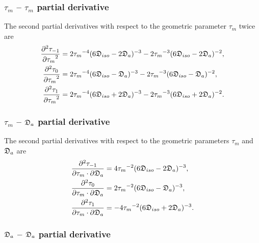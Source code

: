 \subsubsection{$\tau_m$ -- $\tau_m$ partial derivative}

The second partial derivatives with respect to the geometric parameter $\tau_m$ twice are
\begin{subequations}
\begin{align}
    \frac{\partial^2 \tau_{-1}}{{\partial \tau_m}^2} &= 2{\tau_m}^{-4} (6\mathfrak{D}_{iso} - 2\mathfrak{D}_a)^{-3}
        - 2{\tau_m}^{-3} (6\mathfrak{D}_{iso} - 2\mathfrak{D}_a)^{-2}, \\
    \frac{\partial^2 \tau_{0}}{{\partial \tau_m}^2}  &= 2{\tau_m}^{-4} (6\mathfrak{D}_{iso} - \mathfrak{D}_a)^{-3}
        - 2{\tau_m}^{-3} (6\mathfrak{D}_{iso} - \mathfrak{D}_a)^{-2}, \\
    \frac{\partial^2 \tau_{1}}{{\partial \tau_m}^2}  &= 2{\tau_m}^{-4} (6\mathfrak{D}_{iso} + 2\mathfrak{D}_a)^{-3}
        - 2{\tau_m}^{-3} (6\mathfrak{D}_{iso} + 2\mathfrak{D}_a)^{-2}.
\end{align}
\end{subequations}



\subsubsection{$\tau_m$ -- $\mathfrak{D}_a$ partial derivative}

The second partial derivatives with respect to the geometric parameters $\tau_m$ and $\mathfrak{D}_a$ are
\begin{subequations}
\begin{align}
    \frac{\partial^2 \tau_{-1}}{\partial \tau_m \cdot \partial \mathfrak{D}_a} &= 4{\tau_m}^{-2} (6\mathfrak{D}_{iso} - 2\mathfrak{D}_a)^{-3}, \\
    \frac{\partial^2 \tau_{0}}{\partial \tau_m \cdot \partial \mathfrak{D}_a}  &= 2{\tau_m}^{-2} (6\mathfrak{D}_{iso} - \mathfrak{D}_a)^{-3}, \\
    \frac{\partial^2 \tau_{1}}{\partial \tau_m \cdot \partial \mathfrak{D}_a}  &= -4{\tau_m}^{-2} (6\mathfrak{D}_{iso} + 2\mathfrak{D}_a)^{-3}.
\end{align}
\end{subequations}



\subsubsection{$\mathfrak{D}_a$ -- $\mathfrak{D}_a$ partial derivative}

